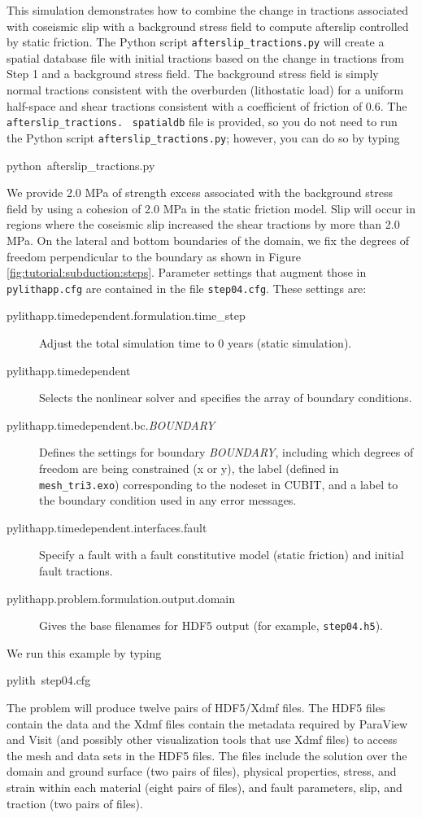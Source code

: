 This simulation demonstrates how to combine the change in tractions
associated with coseismic slip with a background stress field to compute
afterslip controlled by static friction. The Python script \texttt{afterslip\_tractions.py}
will create a spatial database file with initial tractions based on
the change in tractions from Step 1 and a background stress field.
The background stress field is simply normal tractions consistent
with the overburden (lithostatic load) for a uniform half-space and
shear tractions consistent with a coefficient of friction of 0.6.
The \texttt{afterslip\_tractions.}~\linebreak{}
\texttt{spatialdb} file is provided, so you do not need to run the
Python script \texttt{afterslip\_tractions.py}; however, you can do
so by typing
\begin{lyxcode}
python~afterslip\_tractions.py
\end{lyxcode}
We provide 2.0 MPa of strength excess associated with the background
stress field by using a cohesion of 2.0 MPa in the static friction
model. Slip will occur in regions where the coseismic slip increased
the shear tractions by more than 2.0 MPa. On the lateral and bottom
boundaries of the domain, we fix the degrees of freedom perpendicular
to the boundary as shown in Figure \ref{fig:tutorial:subduction:steps}.
Parameter settings that augment those in \texttt{pylithapp.cfg} are
contained in the file \texttt{step04.cfg}. These settings are:
\begin{description}
\item [{pylithapp.timedependent.formulation.time\_step}] Adjust the total
simulation time to 0 years (static simulation).
\item [{pylithapp.timedependent}] Selects the nonlinear solver and specifies
the array of boundary conditions.
\item [{pylithapp.timedependent.bc.\textit{BOUNDARY}}] Defines the settings
for boundary \textit{BOUNDARY}, including which degrees of freedom
are being constrained (x or y), the label (defined in\texttt{ mesh\_tri3.exo})
corresponding to the nodeset in CUBIT, and a label to the boundary
condition used in any error messages.
\item [{pylithapp.timedependent.interfaces.fault}] Specify a fault with
a fault constitutive model (static friction) and initial fault tractions. 
\item [{pylithapp.problem.formulation.output.domain}] Gives the base filenames
for HDF5 output (for example, \texttt{step04.h5}).
\end{description}
We run this example by typing
\begin{lyxcode}
pylith~step04.cfg
\end{lyxcode}
The problem will produce twelve pairs of HDF5/Xdmf files. The HDF5
files contain the data and the Xdmf files contain the metadata required
by ParaView and Visit (and possibly other visualization tools that
use Xdmf files) to access the mesh and data sets in the HDF5 files.
The files include the solution over the domain and ground surface
(two pairs of files), physical properties, stress, and strain within
each material (eight pairs of files), and fault parameters, slip,
and traction (two pairs of files). 

